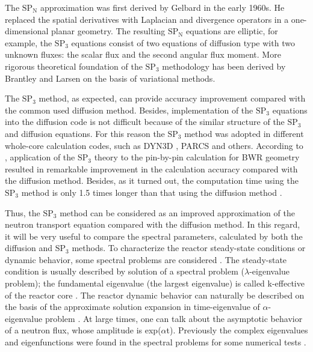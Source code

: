 \documentclass[authoryear]{elsarticle}
\begin{document}
The $\mathrm{SP_N}$ approximation was first derived by Gelbard \citep{gelbard1960application, gelbard1961simplified, gelbard1962applications} in the early 1960s. 
He replaced the spatial derivatives with Laplacian and divergence operators in a one-dimensional planar geometry. 
The resulting $\mathrm{SP_N}$ equations are elliptic, for example, the $\mathrm{SP_3}$ equations consist of two equations of diffusion type with two unknown fluxes: the scalar flux and the second angular flux moment. 
More rigorous theoretical foundation of the $\mathrm{SP_3}$ methodology has been derived by Brantley and Larsen \citep{brantley2000simplified} on the basis of variational methods.

The $\mathrm{SP_3}$ method, as expected, can provide accuracy improvement compared with the common used diffusion method. 
Besides, implementation of the $\mathrm{SP_3}$ equations into the diffusion code is not difficult because of the similar structure of the $\mathrm{SP_3}$ and diffusion equations. 
For this reason the $\mathrm{SP_3}$ method was adopted in different whole-core calculation codes, such as DYN3D \citep{beckert2008development}, PARCS \citep{downar2010theory} and others. According to \citep{tada2008applicability}, application of the $\mathrm{SP_3}$ theory to the pin-by-pin calculation for BWR geometry resulted in remarkable improvement in the calculation accuracy compared with the diffusion method. 
Besides, as it turned out, the computation time using the $\mathrm{SP_3}$ method is only 1.5 times longer than that using the diffusion method \citep{tada2008applicability}.

Thus, the $\mathrm{SP_3}$ method can be considered as an improved approximation of the neutron transport equation compared with the diffusion method. 
In this regard, it will be very useful to compare the spectral parameters, calculated by both the diffusion and $\mathrm{SP_3}$ methods. 
To characterize the reactor steady-state conditions or dynamic behavior, some spectral problems are considered \citep{stacey2007, bell1970}. 
The steady-state condition is usually described by solution of a spectral problem ($\lambda$-eigenvalue problem); the fundamental eigenvalue (the largest eigenvalue) is called k-effective of the reactor core \citep{stacey2007, bell1970}. 
The reactor dynamic behavior can naturally be described on the basis of the approximate solution expansion in time-eigenvalue of $\alpha$-eigenvalue problem \citep{ginestar2002transient, verdu20103d, verdu2014modal}. 
At large times, one can talk about the asymptotic behavior of a neutron flux, whose amplitude is exp($\alpha$t). 
Previously the complex eigenvalues and eigenfunctions were found in the spectral problems for some numerical tests \citep{avvakumov2017spectral}.
\end{document}
